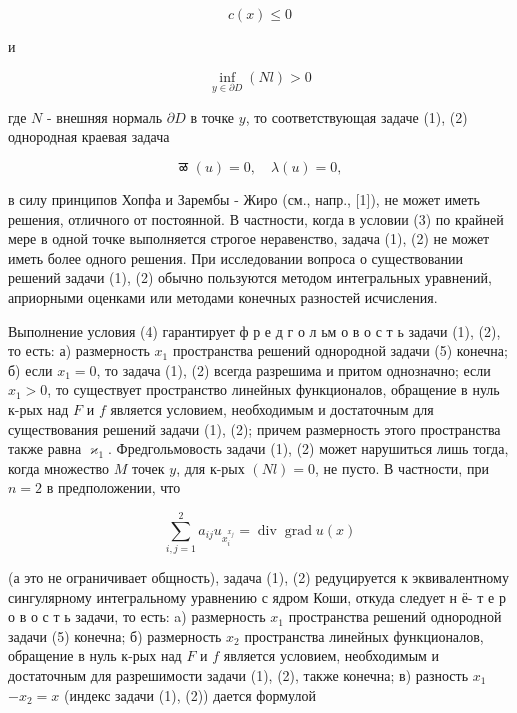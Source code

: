 \documentclass[10pt]{article}
\begin{document}
\[

c(x) \leqslant 0

\]



и



\[

\inf _{y \in \partial D}(N l)>0

\]



где $N$ - внешняя нормаль $\partial D$ в точке $y$, то соответствующая задаче (1), (2) однородная краевая задача



\[

\text { ळ }(u)=0, \quad \lambda(u)=0 \text {, }

\]



в силу принципов Хопфа и Зарембы - Жиро (см., напр., [1]), не может иметь решения, отличного от постоянной. В частности, когда в условии (3) по крайней мере в одной точке выполняется строгое неравенство, задача (1), (2) не может иметь более одного решения. При исследовании вопроса о существовании решений задачи (1), (2) обычно пользуются методом интегральных уравнений, априорными оценками или методами конечных разностей исчисления.



Выполнение условия (4) гарантирует ф р е д г о л ьм о в о с т ь задачи (1), (2), то есть: а) размерность $x_{1}$ пространства решений однородной задачи (5) конечна; б) если $x_{1}=0$, то задача (1), (2) всегда разрешима и притом однозначно; если $x_{1}>0$, то существует пространство линейных функционалов, обращение в нуль к-рых над $F$ и $f$ является условием, необходимым и достаточным для существования решений задачи (1), (2); причем размерность этого пространства также равна $\varkappa_{1}$. Фредгольмовость задачи (1), (2) может нарушиться лишь тогда, когда множество $M$ точек $y$, для к-рых $(N l)=0$, не пусто. В частности, при $n=2$ в предположении, что



\[

\sum_{i, j=1}^{2} a_{i j} u_{x_{i}^{x_{j}}}=\operatorname{div} \operatorname{grad} u(x)

\]



(а это не ограничивает общность), задача (1), (2) редуцируется к эквивалентному сингулярному интегральному уравнению с ядром Коши, откуда следует н ё- т е р о в о с т ь задачи, то есть: a) размерность $x_{1}$ пространства решений однородной задачи (5) конечна; б) размерность $x_{2}$ пространства линейных функционалов, обращение в нуль к-рых над $F$ и $f$ является условием, необходимым и достаточным для разрешимости задачи (1), (2), также конечна; в) разность $x_{1}$ $-x_{2}=x$ (индекс задачи (1), (2)) дается формулой
\end{document}
